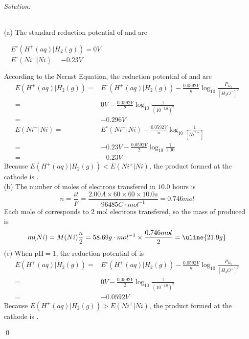 \documentclass[12pt]{article}
\newenvironment{sol}
    {\emph{Solution:}
    }
    {
    \qed
    }
\begin{document}
\begin{sol}
\\(a) The standard reduction potential of  and  are
\begin{center}
~~$E^{\circ}(H^+(aq)|H_2(g))=0V$\\
~~$E^{\circ}(Ni^+|Ni)=-0.23V$
\end{center}
According to the Nernst Equation, the reduction potential of  and  are
\begin{align*}
E(H^+(aq)|H_2(g))=&E^{\circ}(H^+(aq)|H_2(g))-\frac{0.0592V}{n}\log_{10}\frac{P_{H_2}}{[H_3O^+]^2}\\
=&0V-\frac{0.0592V}{2}\log_{10}\frac{1}{(10^{-5.0})^2}\\
=&-0.296V\\
E(Ni^+|Ni)=&E^{\circ}(Ni^+|Ni)-\frac{0.0592V}{n}\log_{10}\frac{1}{[Ni^{2+}]}\\
=&-0.23V-\frac{0.0592V}{2}\log_{10}\frac{1}{1.00}\\
=&-0.23V
\end{align*}
Because $E(H^+(aq)|H_2(g))<E(Ni^+|Ni)$, the product formed at the cathode is \uline{}.\\
(b) The number of moles of electrons transfered in $10.0$ hours is
\[
n=\frac{it}{F}=\frac{2.00A\times60\times60\times10.0s}{96485C\cdot mol^{-1}}=0.746mol
\]
Each mole of  corresponds to $2$ mol electrons transfered, so the mass of  produced is
\[
m(Ni)=M(Ni)\frac{n}{2}=58.69g\cdot mol^{-1}\times\frac{0.746mol}{2}=\uline{21.9g}
\]
(c) When pH$=1$, the reduction potential of  is
\begin{align*}
E(H^+(aq)|H_2(g))=&E^{\circ}(H^+(aq)|H_2(g))-\frac{0.0592V}{n}\log_{10}\frac{P_{H_2}}{[H_3O^+]^2}\\
=&0V-\frac{0.0592V}{2}\log_{10}\frac{1}{(10^{-1.0})^2}\\
=&-0.0592V
\end{align*}
Because $E(H^+(aq)|H_2(g))>E(Ni^+|Ni)$, the product formed at the cathode is \uline{}.
\end{sol}
\end{document}
